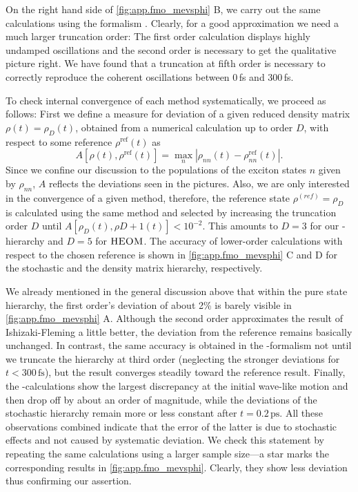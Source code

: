 On the right hand side of \autoref{fig:app.fmo_mevsphi} B, we carry out the same calculations using the \HEOM formalism \cite{StSc12_heom}.
Clearly, for a good approximation we need a much larger truncation order:
The first order calculation displays highly undamped oscillations and the second order is necessary to get the qualitative picture right.
We have found that a truncation at fifth order is necessary to correctly reproduce the coherent oscillations between 0\,fs and 300\,fs.

To check internal convergence of each method systematically, we proceed as follows:
First we define a measure for deviation of a given reduced density matrix $\rho(t) = \rho_D(t)$, obtained from a numerical calculation up to order $D$, with respect to some reference $\rho^{\mathrm{ref}}(t)$ as
\begin{equation}
  A[\rho(t), \rho^\mathrm{ref}(t)] = \max\limits_n \left\vert \rho_{nn}(t) - \rho^{\mathrm{ref}}_{nn}(t) \right\vert.
  \label{eq:app.accuracy}
\end{equation}
Since we confine our discussion to the populations of the exciton states $n$ given by $\rho_{nn}$, $A$ reflects the deviations seen in the pictures.
Also, we are only interested in the convergence of a given method, therefore, the reference state $\rho^{(ref)} = \rho_D$ is calculated using the same method and selected by increasing the truncation order $D$ until $A[\rho_{D}(t), \rho{D+1}(t)] < 10^{-2}$.
This amounts to $D=3$ for our \NMSSE-hierarchy and $D=5$ for $\textsc{HEOM}$.
The accuracy of lower-order calculations with respect to the chosen reference is shown in \autoref{fig:app.fmo_mevsphi} C and D for the stochastic and the density matrix hierarchy, respectively.

We already mentioned in the general discussion above that within the pure state hierarchy, the first order's deviation of about 2\% is barely visible in \autoref{fig:app.fmo_mevsphi} A.
Although the second order approximates the result of Ishizaki-Fleming a little better, the deviation from the reference remains basically unchanged.
In contrast, the same accuracy is obtained in the \HEOM-formalism not until we truncate the hierarchy at third order (neglecting the stronger deviations for $t < 300\,\mathrm{fs}$), but the result converges steadily toward the reference result.
Finally, the \HEOM-calculations show the largest discrepancy at the initial wave-like motion and then drop off by about an order of magnitude, while the deviations of the stochastic hierarchy remain more or less constant after $t = 0.2\,\mathrm{ps}$.
All these observations combined indicate that the error of the latter is due to stochastic effects and not caused by systematic deviation.
We check this statement by repeating the same calculations using a larger sample size---a star marks the corresponding results in \autoref{fig:app.fmo_mevsphi}.
Clearly, they show less deviation thus confirming our assertion.\\


